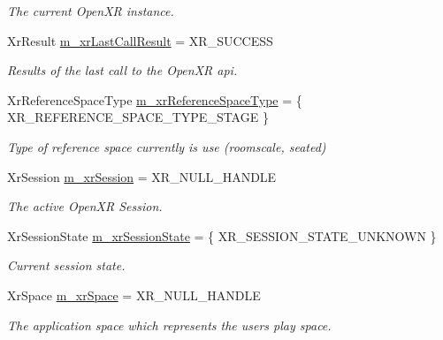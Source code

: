 \begin{DoxyCompactItemize}
\begin{DoxyCompactList}\small\item\em The current Open\+XR instance. \end{DoxyCompactList}\item 
Xr\+Result \mbox{\hyperlink{class_open_x_r_provider_1_1_x_r_core_ada4b0003152567bb71e2ce73641c0e52}{m\+\_\+xr\+Last\+Call\+Result}} = X\+R\+\_\+\+S\+U\+C\+C\+E\+SS
\begin{DoxyCompactList}\small\item\em Results of the last call to the Open\+XR api. \end{DoxyCompactList}\item 
Xr\+Reference\+Space\+Type \mbox{\hyperlink{class_open_x_r_provider_1_1_x_r_core_a6e40635971d1f885b2efe0b7783bc11a}{m\+\_\+xr\+Reference\+Space\+Type}} = \{ X\+R\+\_\+\+R\+E\+F\+E\+R\+E\+N\+C\+E\+\_\+\+S\+P\+A\+C\+E\+\_\+\+T\+Y\+P\+E\+\_\+\+S\+T\+A\+GE \}
\begin{DoxyCompactList}\small\item\em Type of reference space currently is use (roomscale, seated) \end{DoxyCompactList}\item 
Xr\+Session \mbox{\hyperlink{class_open_x_r_provider_1_1_x_r_core_a326233c65ca796a6c42c0c827db542f8}{m\+\_\+xr\+Session}} = X\+R\+\_\+\+N\+U\+L\+L\+\_\+\+H\+A\+N\+D\+LE
\begin{DoxyCompactList}\small\item\em The active Open\+XR Session. \end{DoxyCompactList}\item 
Xr\+Session\+State \mbox{\hyperlink{class_open_x_r_provider_1_1_x_r_core_a5de1028a411debf383f83ef7ca44e50b}{m\+\_\+xr\+Session\+State}} = \{ X\+R\+\_\+\+S\+E\+S\+S\+I\+O\+N\+\_\+\+S\+T\+A\+T\+E\+\_\+\+U\+N\+K\+N\+O\+WN \}
\begin{DoxyCompactList}\small\item\em Current session state. \end{DoxyCompactList}\item 
Xr\+Space \mbox{\hyperlink{class_open_x_r_provider_1_1_x_r_core_ab7d13107684d6e229d9d2036b18e0db6}{m\+\_\+xr\+Space}} = X\+R\+\_\+\+N\+U\+L\+L\+\_\+\+H\+A\+N\+D\+LE
\begin{DoxyCompactList}\small\item\em The application space which represents the user\textquotesingle{}s play space. \end{DoxyCompactList}\item 

\end{DoxyCompactItemize}
